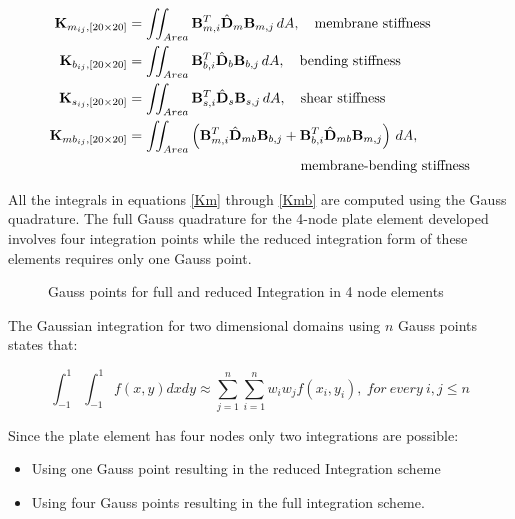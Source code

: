 \begin{align}
  \mathbf{K}_{m_{ij}, [20 \times 20]} &= \iint_{Area} \mathbf{B}_{m,i}^{T}{\hat{\mathbf{D}}}_{m} \mathbf{B}_{m,j} \, dA, \quad \text{membrane stiffness} \label{Km} \\
  \mathbf{K}_{b_{ij}, [20 \times 20]} &= \iint_{Area} \mathbf{B}_{b,i}^{T}{\hat{\mathbf{D}}}_{b} \mathbf{B}_{b,j} \, dA, \quad \text{bending stiffness} \label{Kb}\\
  \mathbf{K}_{s_{ij}, [20 \times 20]} &= \iint_{Area} \mathbf{B}_{s,i}^{T}{\hat{\mathbf{D}}}_{s} \mathbf{B}_{s,j} \, dA, \quad \text{shear stiffness} \label{Ks}\\
  \mathbf{K}_{mb_{ij}, [20 \times 20]} &= \iint_{Area} \left( \mathbf{B}_{m,i}^{T}{\hat{\mathbf{D}}}_{mb} \mathbf{B}_{b,j} + \mathbf{B}_{b,i}^{T}{\hat{\mathbf{D}}}_{mb} \mathbf{B}_{m,j} \right) \, dA, \notag \\
  &\quad \hspace{4cm} \text{membrane-bending stiffness} \label{Kmb}
\end{align}

All the integrals in equations \eqref{Km} through \eqref{Kmb} are computed
using the Gauss quadrature. The full Gauss quadrature for the 4-node
plate element developed involves four integration points while the
reduced integration form of these elements requires only one Gauss
point.

\begin{figure}
    \centering
    
    \caption{Gauss points for full and reduced Integration in 4 node elements}
\end{figure}


The Gaussian integration for two dimensional domains using $n$ Gauss
points states that:

\begin{equation}  
\int_{- 1}^{1}{\int_{- 1}^{1}{f(x,y)dxdy}} \approx \sum_{j = 1}^{n}{\sum_{i = 1}^{n}{w_{i}w_{j}f\left( x_{i},y_{i} \right),\ for\ every\ i,j \leq n}}
\end{equation}

Since the plate element has four nodes only two integrations are
possible:

\begin{itemize}
\item
  Using one Gauss point resulting in the reduced Integration scheme
\item
  Using four Gauss points resulting in the full integration scheme.
\end{itemize}


